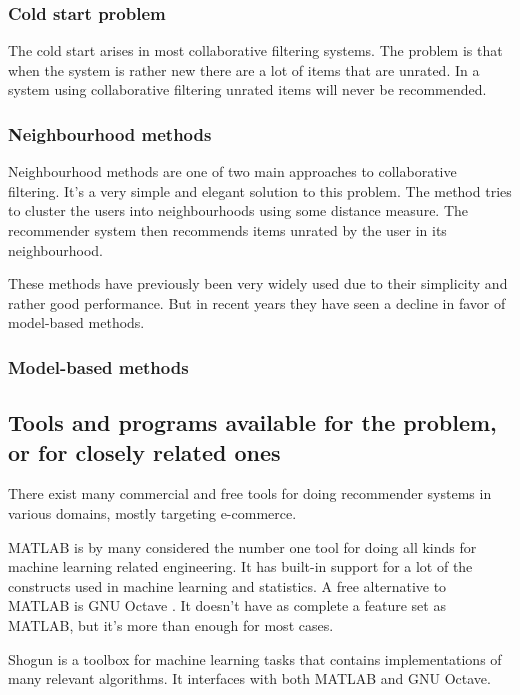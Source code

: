 \documentclass[a4paper,11pt]{article}
\begin{document}
\subsubsection{Cold start problem}
The cold start arises in most collaborative filtering systems. The problem is that when the system is rather new there are a lot of items that are unrated. In a system using collaborative filtering unrated items will never be recommended.

\subsubsection{Neighbourhood methods}
Neighbourhood methods are one of two main approaches to collaborative filtering. It's a very simple and elegant solution to this problem. The method tries to cluster the users into neighbourhoods using some distance measure. The recommender system then recommends items unrated by the user in its neighbourhood.

These methods have previously been very widely used due to their simplicity and rather good performance. But in recent years they have seen a decline in favor of model-based methods.

\subsubsection{Model-based methods}


\subsection{Tools and programs available for the problem, or for closely related ones}
There exist many commercial and free tools for doing recommender systems in various domains, mostly targeting e-commerce.

MATLAB \cite{matlab-ml} is by many considered
the number one tool for doing all kinds for machine learning related engineering. It has built-in support for a lot of the constructs used in
machine learning and statistics. A free alternative to MATLAB is GNU Octave \cite{octave}. It doesn't have as complete a feature set
as MATLAB, but it's more than enough for most cases.

Shogun \cite{shogun} is a toolbox for machine learning tasks that contains implementations of many relevant algorithms. It interfaces with both MATLAB
and GNU Octave.




\end{document}
